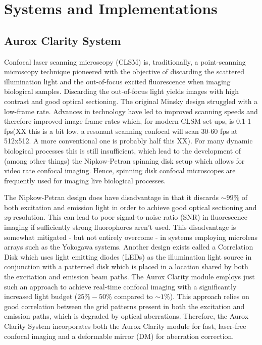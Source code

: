 \chapter{Systems and Implementations}
\label{chpt:sytems}

\section{Aurox Clarity System}
\label{sec:aurox}

Confocal laser scanning microscopy (CLSM) is, traditionally, a
point-scanning microscopy technique pioneered with the objective of
discarding the scattered illumination light and the out-of-focus
excited fluorescence when imaging biological
samples\cite{minsky1988memoir}. Discarding the out-of-focus light
yields images with high contrast and good optical
sectioning\cite{nwaneshiudu2012introduction}. The original Minsky
design struggled with a low-frame rate. Advances in technology have
led to improved scanning speeds and therefore improved image frame
rates which, for modern CLSM set-ups, is 0.1-1
fps\cite{schermelleh2010guide,xiao1988real}(XX this is a bit low, a
resonant scanning confocal will scan 30-60 fps at 512x512. A more
conventional one is probably half this XX). For many dynamic biological processes this is still insufficient, which lead to the development of (among other things) the Nipkow-Petran spinning disk setup which allows for video rate confocal imaging\cite{egger1967new,fuseler2018types,tsien1995video}. Hence, spinning disk confocal microscopes are frequently used for imaging live biological processes.

The Nipkow-Petran design does have disadvantage in that it discards 
$\sim99\%$ of both excitation and emission light in order to achieve good 
optical sectioning and \textit{xy}-resolution\cite{kino1995intermediate}. 
This can lead to poor signal-to-noise ratio (SNR) in fluorescence imaging if 
sufficiently strong fluorophores aren't used\cite{semwogerere2005confocal}. 
This disadvantage is somewhat mitigated - but not entirely overcome - in 
systems employing microlens arrays such as the Yokogawa 
systems\cite{wang2005performance}. Another design exists called a Correlation 
Disk which uses light emitting diodes (LEDs) as the illumination light source 
in conjunction with a patterned disk which is placed in a location shared by 
both the excitation and emission beam 
paths\cite{juskaitis1996efficient,wilson1996confocal,neil1997method}. The 
Aurox Clarity module employs just such an approach to achieve real-time 
confocal imaging with a significantly increased light budget ($25\%-50\%$ 
compared to $\sim1\%$). This approach relies on good correlation between the 
grid patterns present in both the excitation and emission paths, which is 
degraded by optical aberrations\cite{hussain2020wavefront}. Therefore, the 
Aurox Clarity System incorporates both the Aurox Clarity module for fast, 
laser-free confocal imaging and a deformable mirror (DM) for aberration 
correction.

